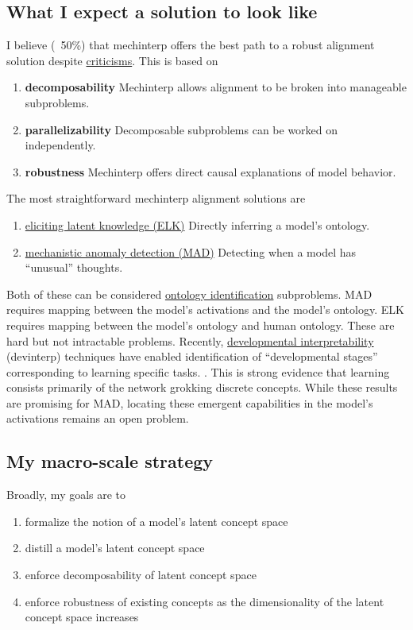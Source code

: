 \subsection{What I expect a solution to look like}
I believe (~50\%) that mechinterp offers the best path to a robust alignment solution despite
\href{https://www.lesswrong.com/posts/tEPHGZAb63dfq2v8n/how-useful-is-mechanistic-interpretability}{criticisms}.
This is based on 
\begin{enumerate}
    \item \textbf{decomposability} Mechinterp allows alignment to be broken into manageable subproblems.
    \item \textbf{parallelizability} Decomposable subproblems can be worked on independently.
    \item \textbf{robustness} Mechinterp offers direct causal explanations of model behavior.
\end{enumerate}
The most straightforward mechinterp alignment solutions are
\begin{enumerate}
    \item \href{https://www.alignment.org/blog/arcs-first-technical-report-eliciting-latent-knowledge/}{eliciting latent knowledge (ELK)} 
    Directly inferring a model's ontology.
    \label{it:elk}
    \item \href{https://www.alignment.org/blog/mechanistic-anomaly-detection-and-elk/}{mechanistic anomaly detection (MAD)} 
    Detecting when a model has ``unusual'' thoughts.
    \label{it:mad}
\end{enumerate}
Both of these can be considered 
\href{https://arbital.greaterwrong.com/p/ontology_identification/}{ontology identification}
subproblems. 
MAD requires mapping between the model's activations and the model's ontology.
ELK requires mapping between the model's ontology and human ontology.
These are hard but not intractable problems.
Recently, \href{https://devinterp.com/}{developmental interpretability} 
(devinterp) techniques have enabled identification of ``developmental stages'' 
corresponding to learning specific tasks.
\cite{hoogland2024developmental}.
This is strong evidence that learning consists primarily of the network
grokking\cite{nanda2023progress} discrete concepts.
While these results are promising for MAD, 
locating these emergent capabilities in the model's activations remains an open problem.

\subsection{My macro-scale strategy}
Broadly, my goals are to
\begin{enumerate}
  \item formalize the notion of a model's latent concept space
  \item distill a model's latent concept space
  \item enforce decomposability of latent concept space
  \item enforce robustness of existing concepts as the dimensionality of the latent concept space increases
\end{enumerate}

